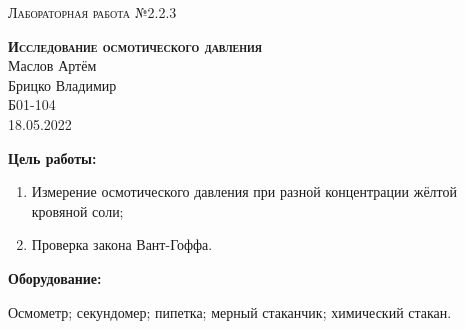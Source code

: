 \documentclass[14pt,a4paper]{extreport}
\begin{document}
	
	\begin{center}
		\large
		\textsc{Лабораторная работа №2.2.3}
		
		\LARGE
		\textbf{\textsc{Исследование осмотического давления}}
		\\[5mm]
		
		\large
		Маслов Артём\\
		Брицко Владимир\\
		Б01-104
		\\[3mm]
		18.05.2022
	\end{center}
	
	\textbf{\large Цель работы:}
	
	\begin{enumerate}
		\item Измерение осмотического давления при разной концентрации жёлтой кровяной соли;
		\item Проверка закона Вант-Гоффа.
	\end{enumerate}
	
	\textbf{\large Оборудование:}
	
	Осмометр; секундомер; пипетка; мерный стаканчик; химический стакан.
	
	
	
	
	
	
	
	
	
\end{document}
